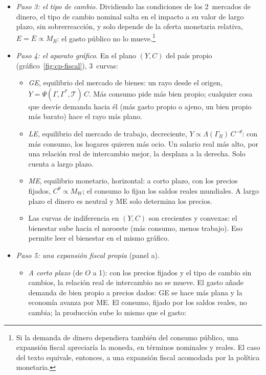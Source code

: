 \documentclass[11pt]{article}
\begin{document}
\begin{itemize}
\item \emph{Paso 3: el tipo de cambio}. Dividiendo las condiciones de los 2~mercados de dinero, el tipo de cambio nominal salta en el impacto a su valor de largo plazo, sin sobrerreacción, y solo depende de la oferta monetaria relativa, $E=\overline{E}\propto M_R$: el gasto público no lo mueve.\footnote{Si la demanda de dinero dependiera también del consumo público, una expansión fiscal apreciaría la moneda, en términos nominales y reales. El caso del texto equivale, entonces, a una expansión fiscal acomodada por la política monetaria\nocite{CorsettiPesenti1997Welfare}.}
\item \emph{Paso 4: el aparato gráfico}. En el plano $(Y,C)$ del país propio (gráfico~\ref{fig:cp-fiscal}), 3~curvas:
  \begin{itemize}
  \item \emph{GE}, equilibrio del mercado de bienes: un rayo desde el origen, $Y=\Psi(\Gamma,\Gamma^*,\mathcal{T})\,C$. Más consumo pide más bien propio; cualquier cosa que desvíe demanda hacia él (más gasto propio o ajeno, un bien propio más barato) hace el rayo más plano.
  \item \emph{LE}, equilibrio del mercado de trabajo, decreciente, $Y\propto\Lambda(\Gamma_R)\,C^{-\theta}$: con más consumo, los hogares quieren más ocio. Un salario real más alto, por una relación real de intercambio mejor, la desplaza a la derecha. Solo cuenta a largo plazo.
  \item \emph{ME}, equilibrio monetario, horizontal: a corto plazo, con los precios fijados, $C^{\theta}\propto M_W$; el consumo lo fijan los saldos reales mundiales. A largo plazo el dinero es neutral y ME solo determina los precios.
  \item Las curvas de indiferencia en $(Y,C)$ son crecientes y convexas: el bienestar sube hacia el noroeste (más consumo, menos trabajo). Eso permite leer el bienestar en el mismo gráfico.
  \end{itemize}
\item \emph{Paso 5: una expansión fiscal propia} (panel a).
  \begin{itemize}
  \item \emph{A corto plazo} (de $O$ a 1): con los precios fijados y el tipo de cambio sin cambios, la relación real de intercambio no se mueve. El gasto añade demanda de bien propio a precios dados: GE se hace más plana y la economía avanza por ME. El consumo, fijado por los saldos reales, no cambia; la producción sube lo mismo que el gasto:

\end{itemize}
\end{itemize}
\end{document}
